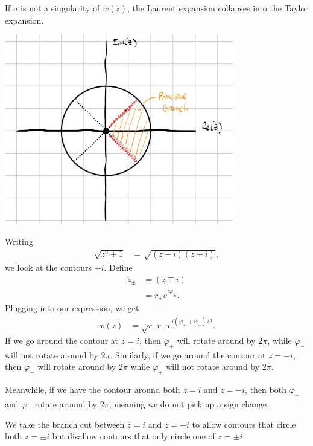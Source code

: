 \documentclass[10pt]{mypackage}
\begin{document}
\begin{solution}[19.9]
  If $a$ is not a singularity of $w(z)$, the Laurent expansion collapses into the Taylor expansion.
\end{solution}
\begin{solution}[19.11]\hfill
  \begin{center}
    \includegraphics[width=10cm]{images/19_11.png}
  \end{center}
\end{solution}
\begin{solution}[19.13]
  Writing
  \begin{align*}
    \sqrt{z^2 + 1} &= \sqrt{\left( z-i \right)\left( z+i \right)},
  \end{align*}
  we look at the contours $\pm i$. Define
  \begin{align*}
    z_{\pm} &= \left( z\mp i \right)\\
            &= r_{\pm}e^{i\varphi_{\pm}}.
  \end{align*}
  Plugging into our expression, we get
  \begin{align*}
    w(z) &= \sqrt{r_{+}r_{-}}e^{i\left( \varphi_{+} + \varphi_{-} \right)/2}.
  \end{align*}
  If we go around the contour at $z = i$, then $\varphi_{+}$ will rotate around by $2\pi$, while $\varphi_{-}$ will not rotate around by $2\pi$. Similarly, if we go around the contour at $z = -i$, then $\varphi_{-}$ will rotate around by $2\pi$ while $\varphi_{+}$ will not rotate around by $2\pi$.\newline

  Meanwhile, if we have the contour around both $z=i$ and $z = -i$, then both $\varphi_{+}$ and $\varphi_{-}$ rotate around by $2\pi$, meaning we do not pick up a sign change.\newline

  We take the branch cut between $z = i$ and $z = -i$ to allow contours that circle both $z = \pm i$ but disallow contours that only circle one of $z = \pm i$.
\end{solution}
\end{document}
